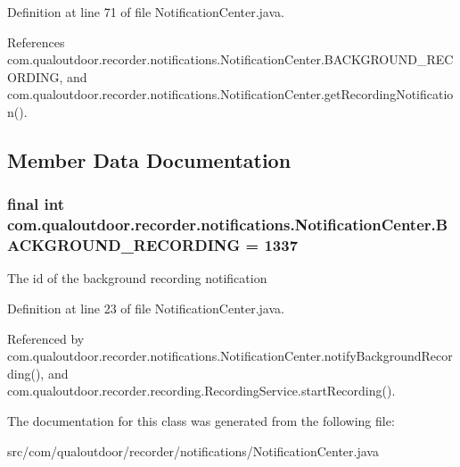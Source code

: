 Definition at line 71 of file Notification\-Center.\-java.



References com.\-qualoutdoor.\-recorder.\-notifications.\-Notification\-Center.\-B\-A\-C\-K\-G\-R\-O\-U\-N\-D\-\_\-\-R\-E\-C\-O\-R\-D\-I\-N\-G, and com.\-qualoutdoor.\-recorder.\-notifications.\-Notification\-Center.\-get\-Recording\-Notification().



\subsection{Member Data Documentation}
\hypertarget{classcom_1_1qualoutdoor_1_1recorder_1_1notifications_1_1NotificationCenter_a1316ea946cb84d237c20e491c363cd33}{
\subsubsection[{B\-A\-C\-K\-G\-R\-O\-U\-N\-D\-\_\-\-R\-E\-C\-O\-R\-D\-I\-N\-G}]{\setlength{\rightskip}{0pt plus 5cm}final int com.\-qualoutdoor.\-recorder.\-notifications.\-Notification\-Center.\-B\-A\-C\-K\-G\-R\-O\-U\-N\-D\-\_\-\-R\-E\-C\-O\-R\-D\-I\-N\-G = 1337\hspace{0.3cm}{\ttfamily [static]}}}\label{classcom_1_1qualoutdoor_1_1recorder_1_1notifications_1_1NotificationCenter_a1316ea946cb84d237c20e491c363cd33}
The id of the background recording notification 

Definition at line 23 of file Notification\-Center.\-java.



Referenced by com.\-qualoutdoor.\-recorder.\-notifications.\-Notification\-Center.\-notify\-Background\-Recording(), and com.\-qualoutdoor.\-recorder.\-recording.\-Recording\-Service.\-start\-Recording().



The documentation for this class was generated from the following file\-:\begin{DoxyCompactItemize}
\item 
src/com/qualoutdoor/recorder/notifications/Notification\-Center.\-java\end{DoxyCompactItemize}
